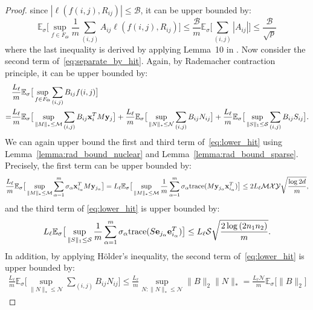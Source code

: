 \documentclass[twoside,11pt]{article}
\def\be{{\bf e}}
\def\bx{{\bf x}}
\def\by{{\bf y}}
\newcommand\Ex[2]{{\mathbb E}_{#1}\big[#2\big]}
\newcommand\trace[1]{{\operatorname{trace}}(#1)}
\def\bmax{{\mathcal B}}
\def\mmax{{\mathcal M}}
\def\nmax{{\mathcal N}}
\def\smax{{\mathcal S}}
\def\xmax{{\mathcal X}}
\def\ymax{{\mathcal Y}}
\begin{document}
\begin{proof}
since $|\ell(f(i,j), R_{ij})| \leq \bmax$, it can be upper bounded by:
\begin{equation*}
  \Ex{\sigma}{\sup_{f\in F_{\Theta}}\frac{1}{m} \sum_{(i,j)}A_{ij} \ell(f(i,j), R_{ij})} \leq
  \frac{\bmax}{m} \Ex{\sigma}{\sum_{(i,j)}|A_{ij}|} \leq \frac{\bmax}{\sqrt{p}}
\end{equation*}
where the last inequality is derived by applying Lemma~10 in \citet{Shamir14a}.
Now consider the second term of~\eqref{eq:separate_by_hit}.
Again, by Rademacher contraction principle,
it can be upper bounded by:
\begin{align}
  &\frac{L_\ell}{m} \Ex{\sigma}{\sup_{f \in F_{\Theta}}\sum_{(i,j)}B_{ij} f(i,j)}\nonumber\\
  = &\frac{L_\ell}{m}\Ex{\sigma}{\sup_{\|M\|_*\leq\mmax} \sum_{(i,j)} B_{ij}\bx_i^TM\by_j}
    + \frac{L_\ell}{m}\Ex{\sigma}{\sup_{\|N\|_*\leq\nmax}\sum_{(i,j)} B_{ij}N_{ij}}
    + \frac{L_\ell}{m}\Ex{\sigma}{\sup_{\|S\|_1\leq\smax}\sum_{(i,j)} B_{ij}S_{ij}}.
    \label{eq:lower_hit}
\end{align}
We can again upper bound the first and third term of~\eqref{eq:lower_hit}
using Lemma~\ref{lemma:rad_bound_nuclear} and Lemma~\ref{lemma:rad_bound_sparse}.  Precisely, the first term can be upper bounded by:
\begin{align*}
      \frac{L_\ell}{m} \Ex{\sigma}{\sup_{\|M\|_*\leq\mmax}\sum_{\alpha=1}^m
       \sigma_\alpha \bx_{i_\alpha}^TM\by_{j_\alpha}}
       = L_\ell \Ex{\sigma}{\sup_{\|M\|_*\leq\mmax} \frac{1}{m}\sum_{\alpha=1}^m
     \sigma_\alpha\trace{M\by_{j_\alpha}\bx_{i_\alpha}^T}}
     \leq 2L_\ell\mmax\xmax\ymax\sqrt{\frac{\log{2d}}{m}},
\end{align*}
and the third term of \eqref{eq:lower_hit} is upper bounded by:
\begin{equation*}
    L_\ell\Ex{\sigma}{\sup_{\|S\|_1\leq\smax} \frac{1}{m}\sum_{\alpha=1}^m
      \sigma_{\alpha}\trace{S\be_{j_\alpha}\be_{i_\alpha}^T}}\\
    \leq L_\ell\smax \sqrt{\frac{2\log{(2n_1n_2)}}{m}}.
\end{equation*}
In addition, by applying H{\"o}lder's inequality, the second term of~\eqref{eq:lower_hit} is upper bounded by:
\begin{align*}
  \frac{L_\ell}{m}\Ex{\sigma}{\sup_{\|N\|_*\leq\nmax}\sum_{(i,j)} B_{ij}N_{ij}}
  \leq
  \frac{L_\ell}{m} \sup_{N:\|N\|_*\leq\nmax} \|B\|_2 \|N\|_* = \frac{L_\ell\nmax}{m} \Ex{\sigma}{\|B\|_2}

\end{align*}
\end{proof}
\end{document}

